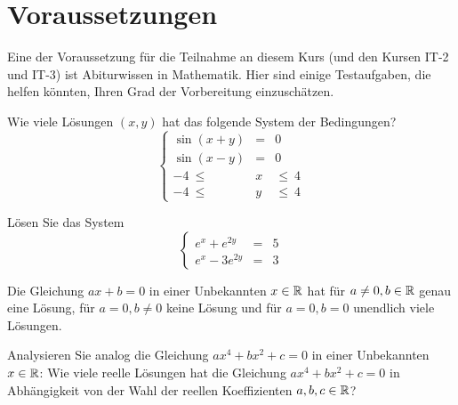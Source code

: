 \section{Voraussetzungen} 

Eine der Voraussetzung für die Teilnahme an diesem Kurs (und den Kursen IT-2 und IT-3) ist Abiturwissen in Mathematik. Hier sind einige Testaufgaben, die helfen könnten, Ihren Grad der Vorbereitung einzuschätzen. 

\begin{aufg}
		Wie viele Lösungen $(x,y)$ hat das folgende System der Bedingungen?
		\[
			\left\{
				\begin{array}{rcl}
						\sin(x+y) & = & 0 
						\\ \sin(x-y) & = & 0
						\\ -4 \ \le & x & \le \ 4
						\\ -4 \ \le & y & \le \ 4
				\end{array} 
				\right.
		\]
\end{aufg} 

\begin{aufg} 
	Lösen Sie das System 
	\[
		\left\{
		\begin{array}{rcl}
			e^x + e^{2y} & = & 5
			\\ e^x - 3 e^{2y} & = & 3
		\end{array} \right. 
	\]
\end{aufg} 

\begin{aufg}
	Die Gleichung $a x + b =0$ in einer Unbekannten $x \in \mathbb{R}$ hat für $a \ne 0, b \in \mathbb{R}$ genau eine Lösung, für $a =0, b \ne 0$ keine Lösung und für $a = 0, b= 0$ unendlich viele Lösungen. 
	
	Analysieren Sie analog die Gleichung $a x^4 + b x^2 + c =0$ in einer Unbekannten $x \in \mathbb{R}$: Wie viele reelle Lösungen hat die Gleichung $a x^4 + b x^2 + c =0$ in Abhängigkeit von der Wahl der reellen Koeffizienten $a,b,c \in \mathbb{R}$? 
\end{aufg} 